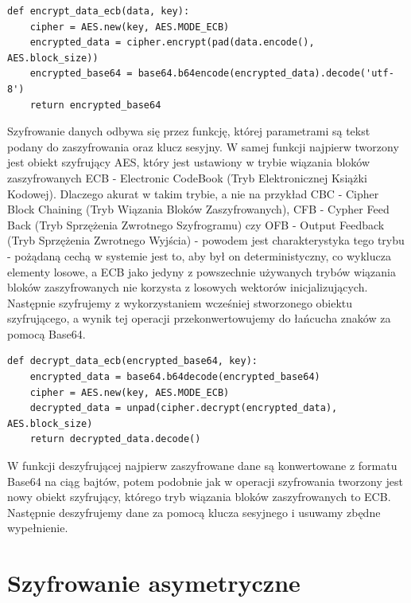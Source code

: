 \begin{lstlisting}
def encrypt_data_ecb(data, key):
    cipher = AES.new(key, AES.MODE_ECB)
    encrypted_data = cipher.encrypt(pad(data.encode(), AES.block_size))
    encrypted_base64 = base64.b64encode(encrypted_data).decode('utf-8')
    return encrypted_base64
\end{lstlisting}
Szyfrowanie danych odbywa się przez funkcję, której parametrami są tekst podany do zaszyfrowania oraz klucz sesyjny. W samej funkcji najpierw tworzony jest obiekt szyfrujący AES, który jest ustawiony w trybie wiązania bloków zaszyfrowanych ECB - Electronic CodeBook (Tryb Elektronicznej Książki Kodowej). Dlaczego akurat w takim trybie, a nie na przykład CBC - Cipher Block Chaining (Tryb Wiązania Bloków Zaszyfrowanych), CFB - Cypher Feed Back (Tryb Sprzężenia Zwrotnego Szyfrogramu) czy OFB - Output Feedback (Tryb Sprzężenia Zwrotnego Wyjścia) - powodem jest charakterystyka tego trybu - pożądaną cechą w systemie jest to, aby był on deterministyczny, co wyklucza elementy losowe, a ECB jako jedyny z powszechnie używanych trybów wiązania bloków zaszyfrowanych nie korzysta z losowych wektorów inicjalizujących. Następnie szyfrujemy z wykorzystaniem wcześniej stworzonego obiektu szyfrującego, a wynik tej operacji przekonwertowujemy do łańcucha znaków za pomocą Base64.

\begin{lstlisting}
def decrypt_data_ecb(encrypted_base64, key):
    encrypted_data = base64.b64decode(encrypted_base64)
    cipher = AES.new(key, AES.MODE_ECB)
    decrypted_data = unpad(cipher.decrypt(encrypted_data), AES.block_size)
    return decrypted_data.decode()
\end{lstlisting}
W funkcji deszyfrującej najpierw zaszyfrowane dane są konwertowane z formatu Base64 na ciąg bajtów, potem podobnie jak w operacji szyfrowania tworzony jest nowy obiekt szyfrujący, którego tryb wiązania bloków zaszyfrowanych to ECB. Następnie deszyfrujemy dane za pomocą klucza sesyjnego i usuwamy zbędne wypełnienie.

\section{Szyfrowanie asymetryczne}

